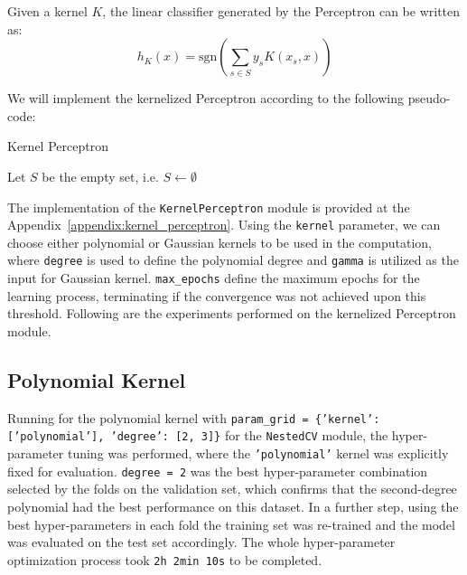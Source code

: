 Given a kernel $K$, the linear classifier generated by the Perceptron can be written as:
\begin{equation}
    h_K(x) = \text{sgn} \left(\sum_{s \in S} y_s K(x_s, x) \right)
\end{equation}

We will implement the kernelized Perceptron according to the following pseudo-code:

\begin{algorithm}[H]
    \SetAlgoLined
    \DontPrintSemicolon
    \caption{Kernel Perceptron}
    Let $S$ be the empty set, i.e. $S \leftarrow \emptyset$ \\
\end{algorithm}

The implementation of the \texttt{KernelPerceptron} module is provided at the Appendix~\ref{appendix:kernel_perceptron}. Using the \texttt{kernel} parameter, we can choose either polynomial or Gaussian kernels to be used in the computation, where \texttt{degree} is used to define the polynomial degree and \texttt{gamma} is utilized as the input for Gaussian kernel. \texttt{max\_epochs} define the maximum epochs for the learning process, terminating if the convergence was not achieved upon this threshold. Following are the experiments performed on the kernelized Perceptron module.

\subsection{Polynomial Kernel}

Running for the polynomial kernel with \texttt{param\_grid = \{'kernel': ['polynomial'], 'degree': [2, 3]\}} for the \texttt{NestedCV} module, the hyper-parameter tuning was performed, where the \texttt{'polynomial'} kernel was explicitly fixed for evaluation. \texttt{degree = 2} was the best hyper-parameter combination selected by the folds on the validation set, which confirms that the second-degree polynomial had the best performance on this dataset. In a further step, using the best hyper-parameters in each fold the training set was re-trained and the model was evaluated on the test set accordingly. The whole hyper-parameter optimization process took \texttt{2h 2min 10s} to be completed.

